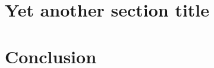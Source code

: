 \documentclass{cseminar}
\begin{document}


\section{Yet another section title}




\section{Conclusion}





\fi

\end{document}
